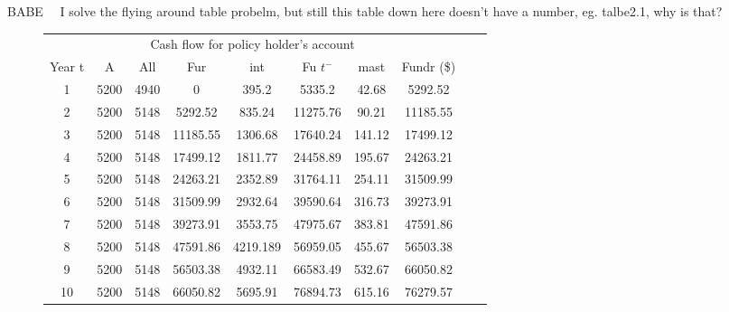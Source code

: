 \documentclass{report}
\begin{document}
BABE~~ I solve the flying around table probelm, but still this table down here doesn't have a number, eg. talbe2.1, why is that?

\begin{figure}[h]
\begin{tabular}{c c c c c c c c c c}
\toprule
\multicolumn{8}{c}{Cash flow for policy holder's account} \\
\cmidrule(r){3-7}

Year t & A & All & Fur & int & Fu $t^-$ & mast & Fundr (\$) \\
\midrule
1	&5200	&4940	&0&	395.2	&5335.2	&42.68	&5292.52\\
2	&5200	&5148	&5292.52	 &   835.24	&11275.76 &	90.21	&11185.55\\
3	&5200	&5148	&11185.55&  1306.68	&17640.24	&141.12  &17499.12\\
4&	5200	&5148	&17499.12&  1811.77&	24458.89	&    195.67       &24263.21\\
5&	5200	&5148&	24263.21	&    2352.89&	31764.11	&   254.11	&31509.99\\
6&	5200	&5148&	31509.99	&   2932.64&	39590.64	&   316.73	&39273.91\\
7&	5200	&5148&	39273.91	&   3553.75&	47975.67	&   383.81	&47591.86\\
8&	5200	&5148&	47591.86	&   4219.189&	56959.05	&  455.67	    &56503.38\\
9&	5200	&5148&	56503.38	&   4932.11&	66583.49	&  532.67 	&66050.82\\
10&	5200	&5148	&66050.82	&5695.91	&76894.73	&615.16	&76279.57\\
\bottomrule
\end{tabular}
\end{figure}
\end{document}
